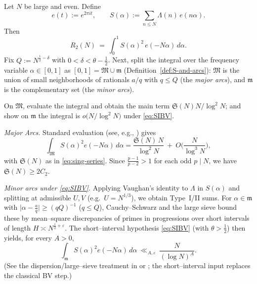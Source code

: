 \documentclass[11pt]{article}
\makeatletter
\theoremstyle{inline}
\theoremstyle{break}
\renewenvironment{proof}[1][\proofname]{%
  \par\pushQED{\qed}%
  \normalfont \topsep6\p@\@plus6\p@\relax
  \trivlist
  \item[\hskip\labelsep
        \itshape
    #1\@addpunct{.}]\mbox{}\\  %
}{%
  \popQED\endtrivlist\@endpefalse
}
\theoremstyle{break}
\theoremstyle{break}
\theoremstyle{break}
\theoremstyle{break}
\theoremstyle{break}
\theoremstyle{break}
\theoremstyle{inline}
\makeatother
\begin{document}
\begin{proof}
Let \(N\) be large and even. Define
\begin{equation}\label{eq:S-alpha}
e(t):=e^{2\pi i t},\qquad
S(\alpha):=\sum_{n\le N}\Lambda(n)\,e(n\alpha).
\end{equation}
Then
\begin{equation}\label{eq:R2-int-again}
R_2(N)\ =\ \int_0^1 S(\alpha)^2\,e(-N\alpha)\,d\alpha.
\end{equation}
Fix \(Q:=N^{\frac{1}{2}-\delta}\) with \(0<\delta<\theta-\tfrac12\).  Next, split the integral over the frequency variable \(\alpha\in[0,1]\) as
\([0,1]=\mathfrak M\cup\mathfrak m\) (Definition~\ref{def:S-and-arcs}): 
\(\mathfrak M\) is the union of small neighborhoods of rationals \(a/q\) with \(q\le Q\) (the \emph{major arcs}), and \(\mathfrak m\) is the complementary set (the \emph{minor arcs}).

On \(\mathfrak M\), evaluate the integral and obtain the main term \(\mathfrak S(N)N/\log^2 N\); 
and show on \(\mathfrak m\) the integral is \(o\!\big(N/\log^2 N\big)\) under \eqref{eq:SIBV}.

\medskip\noindent\emph{Major Arcs.}
Standard evaluation (see, e.g., \cite[Thm.~13.12]{MontgomeryVaughan2007}) gives
\begin{equation}\label{eq:major-arc-again}
\int_{\mathfrak M} S(\alpha)^2 e(-N\alpha)\,d\alpha
=\frac{\mathfrak S(N)\,N}{\log^2 N}\ +\ O\!\Big(\frac{N}{\log^3 N}\Big),
\end{equation}
with \(\mathfrak S(N)\) as in \eqref{eq:sing-series}. Since \(\frac{p-1}{p-2}>1\) for each odd \(p\mid N\), we have \(\mathfrak S(N)\ge 2C_2\).

\medskip\noindent\emph{Minor arcs under \eqref{eq:SIBV}.}
Applying Vaughan’s identity to \(\Lambda\) in \(S(\alpha)\) and splitting at admissible \(U,V\) (e.g.\ \(U=N^{1/3}\)), we obtain Type~I/II sums. For \(\alpha\in\mathfrak m\) with \(\bigl|\alpha-\tfrac{a}{q}\bigr|\ge (qQ)^{-1}\) (\(q\le Q\)), Cauchy–Schwarz and the large sieve bound these by mean–square discrepancies of primes in progressions over short intervals of length \(H\asymp N^{\frac{1}{2}+\varepsilon}\). The short–interval hypothesis \eqref{eq:SIBV} (with \(\theta>\tfrac12\)) then yields, for every \(A>0\),
\begin{equation}\label{eq:major-arc-again}
\int_{\mathfrak m} S(\alpha)^2 e(-N\alpha)\,d\alpha\ \ll_{A,\varepsilon}\ \frac{N}{(\log N)^A}.
\end{equation}
(See the dispersion/large–sieve treatment in \cite[Chs.~17–18]{IwaniecKowalski2004} or \cite[Chs.~17,\,28]{Harman2007}; the short–interval input replaces the classical BV step.)


\end{proof}
\end{document}
